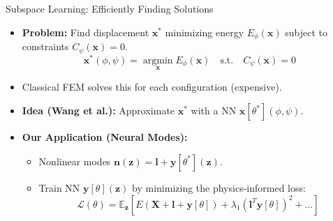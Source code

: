 \documentclass{beamer}
\DeclareMathOperator{\argmin}{argmin}
\begin{document}
\begin{frame}{Subspace Learning: Efficiently Finding Solutions}
    \begin{itemize}
        \item \textbf{Problem:} Find displacement \(\bm{x}^*\) minimizing energy \(E_\phi(\bm{x})\) subject to constraints \(C_\psi(\bm{x})=0\).
        \begin{equation*}
            \bm{x}^*(\phi, \psi) = \underset{\bm{x}}{\argmin} E_\phi(\bm{x}) \quad \text{s.t.} \quad C_\psi(\bm{x}) = 0
        \end{equation*}
        \item Classical FEM solves this for each configuration (expensive).
        \item \textbf{Idea (Wang et al.):} Approximate \(\bm{x}^*\) with a NN \(\bm{x}[\theta^*](\phi, \psi)\).
        \item \textbf{Our Application (Neural Modes):}
        \begin{itemize}
            \item Nonlinear modes \(\bm{n}(\bm{z}) = \bm{l} + \bm{y}[\theta^*](\bm{z})\).
            \item Train NN \(\bm{y}[\theta](\bm{z})\) by minimizing the physics-informed loss:
            \begin{equation*}
                \mathcal{L}(\theta) = \mathbb{E}_{\bm{z}} \left[ E(\bm{X} + \bm{l} + \bm{y}[\theta]) + \lambda_1 (\bm{l}^T \bm{y}[\theta])^2 + \dots \right]
            \end{equation*}
        \end{itemize}
    \end{itemize}
\end{frame}
\end{document}
